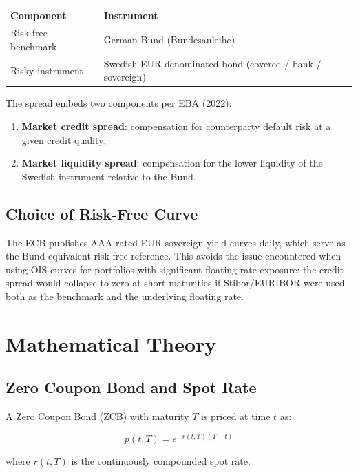 \documentclass[11pt, a4paper]{article}
\begin{document}
\begin{center}
\begin{tabular}{ll}
    \toprule
    \textbf{Component} & \textbf{Instrument} \\
    \midrule
    Risk-free benchmark & German Bund (Bundesanleihe) \\
    Risky instrument    & Swedish EUR-denominated bond (covered / bank / sovereign) \\
    \bottomrule
\end{tabular}
\end{center}

The spread embeds two components per EBA (2022):
\begin{enumerate}[noitemsep]
    \item \textbf{Market credit spread}: compensation for counterparty default risk at a given credit quality;
    \item \textbf{Market liquidity spread}: compensation for the lower liquidity of the Swedish instrument relative to the Bund.
\end{enumerate}

\subsection{Choice of Risk-Free Curve}

The ECB publishes AAA-rated EUR sovereign yield curves daily, which serve as the Bund-equivalent risk-free reference. This avoids the issue encountered when using OIS curves for portfolios with significant floating-rate exposure: the credit spread would collapse to zero at short maturities if Stibor/EURIBOR were used both as the benchmark and the underlying floating rate.

\section{Mathematical Theory}

\subsection{Zero Coupon Bond and Spot Rate}

A Zero Coupon Bond (ZCB) with maturity $T$ is priced at time $t$ as:

\[
    p(t, T) = e^{-r(t,T)(T-t)}
\]

where $r(t, T)$ is the continuously compounded spot rate.
\end{document}
